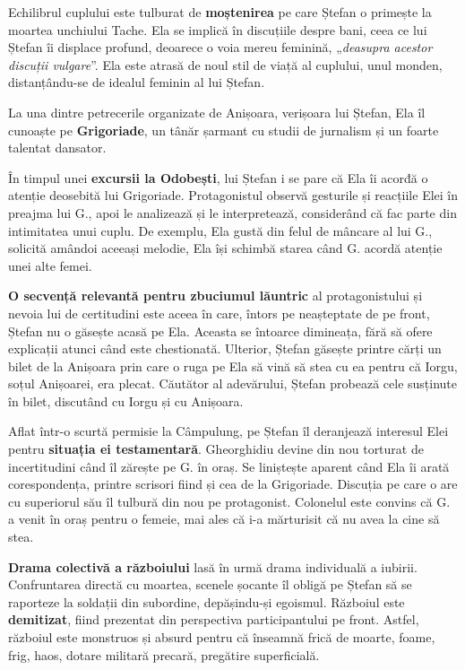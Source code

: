 \documentclass{article}
\newcommand{\qu}[1]{„\emph{#1}”}
\begin{document}
Echilibrul cuplului este tulburat de \textbf{moștenirea} pe care Ștefan o primește la moartea unchiului Tache. Ela se implică în discuțiile despre bani, ceea ce lui Ștefan îi displace profund, deoarece o voia mereu feminină, \qu{deasupra acestor discuții vulgare}. Ela este atrasă de noul stil de viață al cuplului, unul monden, distanțându-se de idealul feminin al lui Ștefan.

La una dintre petrecerile organizate de Anișoara, verișoara lui Ștefan, Ela îl cunoaște pe \textbf{Grigoriade}, un tânăr șarmant cu studii de jurnalism și un foarte talentat dansator.

În timpul unei \textbf{excursii la Odobești}, lui Ștefan i se pare că Ela îi acorđă o atenție deosebită lui Grigoriade. Protagonistul observă gesturile și reacțiile Elei în preajma lui G., apoi le analizează și le interpretează, considerând că fac parte din intimitatea unui cuplu. De exemplu, Ela gustă din felul de mâncare al lui G., solicită amândoi aceeași melodie, Ela își schimbă starea când G. acordă atenție unei alte femei.

\textbf{O secvență relevantă pentru zbuciumul lăuntric} al protagonistului și nevoia lui de certitudini este aceea în care, întors pe neașteptate de pe front, Ștefan nu o găsește acasă pe Ela. Aceasta se întoarce dimineața, fără să ofere explicații atunci când este chestionată. Ulterior, Ștefan găsește printre cărți un bilet de la Anișoara prin care o ruga pe Ela să vină să stea cu ea pentru că Iorgu, soțul Anișoarei, era plecat. Căutător al adevărului, Ștefan probează cele susținute în bilet, discutând cu Iorgu și cu Anișoara.

Aflat într-o scurtă permisie la Câmpulung, pe Ștefan îl deranjează interesul Elei pentru \textbf{situația ei testamentară}. Gheorghidiu devine din nou torturat de incertitudini când îl zărește pe G. în oraș. Se liniștește aparent când Ela îi arată corespondența, printre scrisori fiind și cea de la Grigoriade. Discuția pe care o are cu superiorul său îl tulbură din nou pe protagonist. Colonelul este convins că G. a venit în oraș pentru o femeie, mai ales că i-a mărturisit că nu avea la cine să stea.

\textbf{Drama colectivă a războiului} lasă în urmă drama individuală a iubirii. Confruntarea directă cu moartea, scenele șocante îl obligă pe Ștefan să se raporteze la soldații din subordine, depășindu-și egoismul. Războiul este \textbf{demitizat}, fiind prezentat din perspectiva participantului pe front. Astfel, războiul este monstruos și absurd pentru că înseamnă frică de moarte, foame, frig, haos, dotare militară precară, pregătire superficială.
\end{document}
